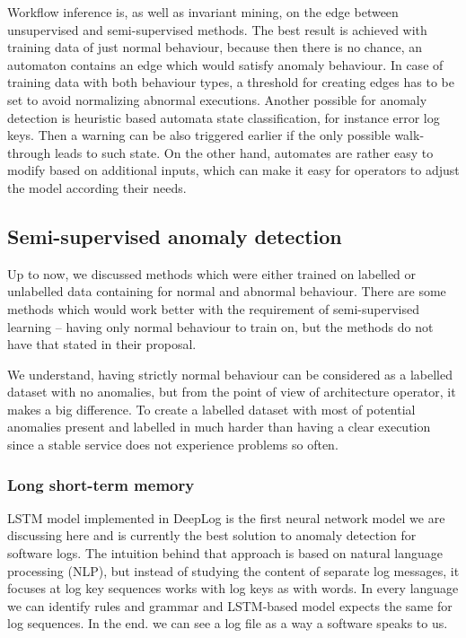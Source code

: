 Workflow inference is, as well as invariant mining, on the edge between unsupervised and semi-supervised methods. The best result is achieved with training data of just normal behaviour, because then there is no chance, an automaton contains an edge which would satisfy anomaly behaviour. In case of training data with both behaviour types, a threshold for creating edges has to be set to avoid normalizing abnormal executions. Another possible for anomaly detection is heuristic based automata state classification, for instance error log keys. Then a warning can be also triggered earlier if the only possible walk-through leads to such state. On the other hand, automates are rather easy to modify based on additional inputs, which can make it easy for operators to adjust the model according their needs.


\subsection{Semi-supervised anomaly detection}
Up to now, we discussed methods which were either trained on labelled or unlabelled data containing for normal and abnormal behaviour. There are some methods which would work better with the requirement of semi-supervised learning – having only normal behaviour to train on, but the methods do not have that stated in their proposal. 

We understand, having strictly normal behaviour can be considered as a labelled dataset with no anomalies, but from the point of view of architecture operator, it makes a big difference. To create a labelled dataset with most of potential anomalies present and labelled in much harder than having a clear execution since a stable service does not experience problems so often.
\subsubsection{Long short-term memory}

LSTM \cite{hochreiter1997long} model implemented in DeepLog \cite{du2017deeplog} is the first neural network model we are discussing here and is currently the best solution to anomaly detection for software logs.  The intuition behind that approach is based on natural language processing (NLP), but instead of studying the content of separate log messages, it focuses at log key sequences works with log keys as with words. In every language we can identify rules and grammar and LSTM-based model expects the same for log sequences. In the end. we can see a log file as a way a software speaks to us.

